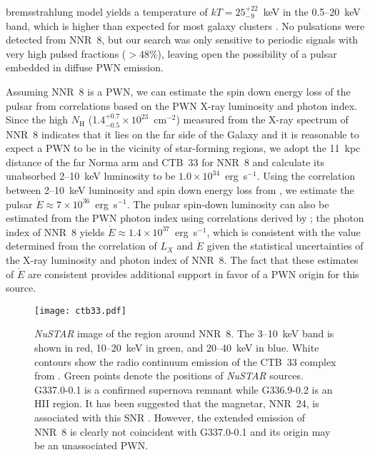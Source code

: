 \documentclass[iop,revtex4]{emulateapj}
\begin{document}
bremsstrahlung model yields a temperature of $kT = 25^{+22}_{-9}$~keV in the 0.5--20~keV band, which is higher than expected for most galaxy clusters \citep{maughan12}.  No pulsations were detected from NNR~8, but our search was only sensitive to periodic signals with very high pulsed fractions ($>48$\%), leaving open the possibility of a pulsar embedded in diffuse PWN emission.\par
Assuming NNR~8 is a PWN, we can estimate the spin down energy loss of the pulsar from correlations based on the PWN X-ray luminosity and photon index.  Since the high $N_{\mathrm{H}}$ (1.4$^{+0.7}_{-0.5}\times10^{23}$~cm$^{-2}$) measured from the X-ray spectrum of NNR~8 indicates that it lies on the far side of the Galaxy and it is reasonable to expect a PWN to be in the vicinity of star-forming regions, we adopt the 11~kpc distance of the far Norma arm and CTB~33 for NNR~8 and calculate its unabsorbed 2--10~keV luminosity to be $1.0\times10^{34}$~erg~s$^{-1}$.  Using the correlation between 2--10~keV luminosity and spin down energy loss from \citet{possenti02}, we estimate the pulsar $\dot{E}\approx7\times10^{36}$~erg~s$^{-1}$.  The pulsar spin-down luminosity can also be estimated from the PWN photon index using correlations derived by \citet{gotthelf03}; the photon index of NNR~8 yields $\dot{E}\approx1.4\times10^{37}$~erg~s$^{-1}$, which is consistent with the value determined from the correlation of $L_X$ and $\dot{E}$ given the statistical uncertainties of the X-ray luminosity and photon index of NNR~8.  The fact that these estimates of $\dot{E}$ are consistent provides additional support in favor of a PWN origin for this source. \par

\begin{figure}
\texttt{[image: ctb33.pdf]}
\caption{\textit{NuSTAR} image of the region around NNR~8.  The 3--10~keV band is shown in red, 10--20~keV in green, and 20--40~keV in blue.  White contours show the radio continuum emission of the CTB~33 complex from \citet{sarma97}.  Green points denote the positions of \textit{NuSTAR} sources. G337.0-0.1 is a confirmed supernova remnant while G336.9-0.2 is an H{\small II} region.  It has been suggested that the magnetar, NNR~24, is associated with this SNR \citep{brogan00}.  However, the extended emission of NNR~8 is clearly not coincident with G337.0-0.1 and its origin may be an unassociated PWN. }
\label{fig:ctb33}
\end{figure}
\end{document}
